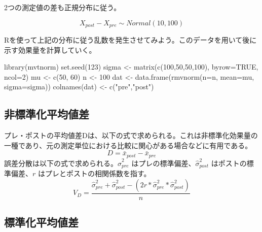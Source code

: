 \documentclass[
  ja=standard, xelatex, base=12pt]{bxjsreport}
\newenvironment{Shaded}{\begin{snugshade}}{\end{snugshade}}
\newcommand{\AttributeTok}[1]{\textcolor[rgb]{0.77,0.63,0.00}{#1}}
\newcommand{\ConstantTok}[1]{\textcolor[rgb]{0.00,0.00,0.00}{#1}}
\newcommand{\DecValTok}[1]{\textcolor[rgb]{0.00,0.00,0.81}{#1}}
\newcommand{\FunctionTok}[1]{\textcolor[rgb]{0.00,0.00,0.00}{#1}}
\newcommand{\NormalTok}[1]{#1}
\newcommand{\OtherTok}[1]{\textcolor[rgb]{0.56,0.35,0.01}{#1}}
\newcommand{\StringTok}[1]{\textcolor[rgb]{0.31,0.60,0.02}{#1}}
\begin{document}
2つの測定値の差も正規分布に従う。

\[
X_{post}-X_{pre}\sim Normal(10, 100)
\]

Rを使って上記の分布に従う乱数を発生させてみよう。このデータを用いて後に示す効果量を計算していく。

\begin{Shaded}
\begin{Highlighting}[]
\FunctionTok{library}\NormalTok{(mvtnorm)}
\FunctionTok{set.seed}\NormalTok{(}\DecValTok{123}\NormalTok{)}
\NormalTok{sigma }\OtherTok{\textless{}{-}} \FunctionTok{matrix}\NormalTok{(}\FunctionTok{c}\NormalTok{(}\DecValTok{100}\NormalTok{,}\DecValTok{50}\NormalTok{,}\DecValTok{50}\NormalTok{,}\DecValTok{100}\NormalTok{), }\AttributeTok{byrow=}\ConstantTok{TRUE}\NormalTok{, }\AttributeTok{ncol=}\DecValTok{2}\NormalTok{) }
\NormalTok{mu }\OtherTok{\textless{}{-}} \FunctionTok{c}\NormalTok{(}\DecValTok{50}\NormalTok{, }\DecValTok{60}\NormalTok{)}
\NormalTok{n }\OtherTok{\textless{}{-}} \DecValTok{100}
\NormalTok{dat }\OtherTok{\textless{}{-}} \FunctionTok{data.frame}\NormalTok{(}\FunctionTok{rmvnorm}\NormalTok{(}\AttributeTok{n=}\NormalTok{n, }\AttributeTok{mean=}\NormalTok{mu, }\AttributeTok{sigma=}\NormalTok{sigma)) }
\FunctionTok{colnames}\NormalTok{(dat) }\OtherTok{\textless{}{-}} \FunctionTok{c}\NormalTok{(}\StringTok{"pre"}\NormalTok{,}\StringTok{"post"}\NormalTok{)}
\end{Highlighting}
\end{Shaded}

\hypertarget{ux975eux6a19ux6e96ux5316ux5e73ux5747ux5024ux5dee-1}{%
\subsection{非標準化平均値差}\label{ux975eux6a19ux6e96ux5316ux5e73ux5747ux5024ux5dee-1}}

プレ・ポストの平均値差Dは、以下の式で求められる。これは非標準化効果量の一種であり、元の測定単位における比較に関心がある場合などに有用である。 \[
D=\bar{x}_{post}-\bar{x}_{pre}
\] 誤差分散は以下の式で求められる。\(\hat\sigma^2_{pre}\) はプレの標準偏差、\(\hat\sigma^2_{post}\) はポストの標準偏差、\(r\) はプレとポストの相関係数を指す。 \[
V_D=\frac{\hat\sigma^2_{pre}+\hat\sigma^2_{post}-(2r*\hat\sigma^2_{pre}*\hat\sigma^2_{post})}{n}
\]

\hypertarget{ux6a19ux6e96ux5316ux5e73ux5747ux5024ux5dee-1}{%
\subsection{標準化平均値差}\label{ux6a19ux6e96ux5316ux5e73ux5747ux5024ux5dee-1}}
\end{document}
